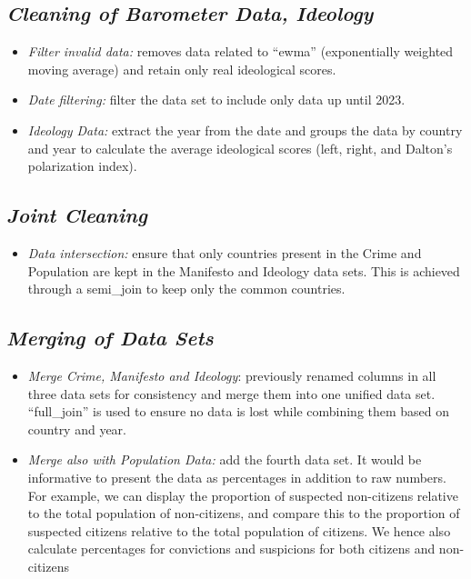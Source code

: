 \documentclass[
]{article}
\providecommand{\tightlist}{%
  \setlength{\itemsep}{0pt}\setlength{\parskip}{0pt}}\usepackage{longtable,booktabs,array}
\begin{document}
\subsection{\texorpdfstring{\emph{Cleaning of Barometer Data,
Ideology}}{Cleaning of Barometer Data, Ideology}}\label{cleaning-of-barometer-data-ideology}

\begin{itemize}
\item
  \emph{Filter invalid data:} removes data related to ``ewma''
  (exponentially weighted moving average) and retain only real
  ideological scores.
\item
  \emph{Date filtering:} filter the data set to include only data up
  until 2023.
\item
  \emph{Ideology Data:} extract the year from the date and groups the
  data by country and year to calculate the average ideological scores
  (left, right, and Dalton's polarization index).
\end{itemize}

\subsection{\texorpdfstring{\emph{Joint
Cleaning}}{Joint Cleaning}}\label{joint-cleaning}

\begin{itemize}
\tightlist
\item
  \emph{Data intersection:} ensure that only countries present in the
  Crime and Population are kept in the Manifesto and Ideology data sets.
  This is achieved through a semi\_join to keep only the common
  countries.
\end{itemize}

\subsection{\texorpdfstring{\emph{Merging of Data
Sets}}{Merging of Data Sets}}\label{merging-of-data-sets}

\begin{itemize}
\item
  \emph{Merge Crime, Manifesto and Ideology}: previously renamed columns
  in all three data sets for consistency and merge them into one unified
  data set. ``full\_join'' is used to ensure no data is lost while
  combining them based on country and year.
\item
  \emph{Merge also with Population Data:} add the fourth data set. It
  would be informative to present the data as percentages in addition to
  raw numbers. For example, we can display the proportion of suspected
  non-citizens relative to the total population of non-citizens, and
  compare this to the proportion of suspected citizens relative to the
  total population of citizens. We hence also calculate percentages for
  convictions and suspicions for both citizens and non-citizens
\end{itemize}
\end{document}
